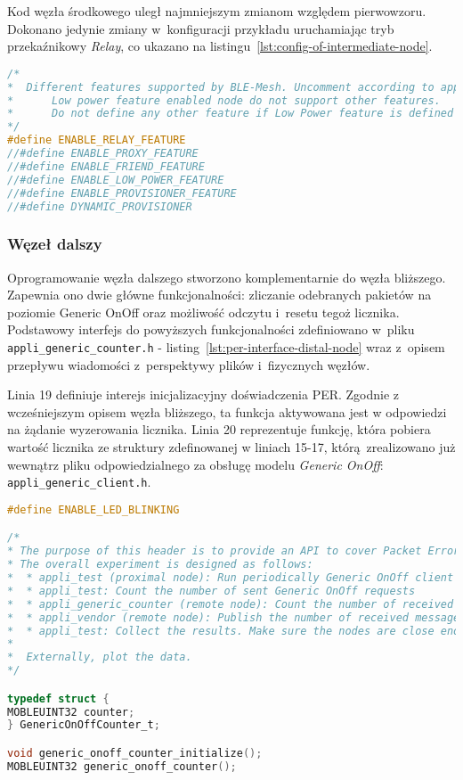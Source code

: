 Kod węzła środkowego uległ najmniejszym zmianom względem pierwowzoru. Dokonano jedynie zmiany w~konfiguracji przykładu
uruchamiając tryb przekaźnikowy \textit{Relay}, co ukazano na listingu~\ref{lst:config-of-intermediate-node}.

\begin{lstlisting}[language=C,
    caption={Konfiguracja węzła środkowego},
    label={lst:config-of-intermediate-node}]
/*
*  Different features supported by BLE-Mesh. Uncomment according to application.
*      Low power feature enabled node do not support other features. 
*      Do not define any other feature if Low Power feature is defined
*/
#define ENABLE_RELAY_FEATURE
//#define ENABLE_PROXY_FEATURE
//#define ENABLE_FRIEND_FEATURE
//#define ENABLE_LOW_POWER_FEATURE
//#define ENABLE_PROVISIONER_FEATURE
//#define DYNAMIC_PROVISIONER
\end{lstlisting}

\subsubsection{Węzeł dalszy}

Oprogramowanie węzła dalszego stworzono komplementarnie do węzła bliższego. Zapewnia ono dwie główne funkcjonalności:
zliczanie odebranych pakietów na poziomie Generic OnOff oraz możliwość odczytu i~resetu tegoż licznika. Podstawowy interfejs do 
powyższych funkcjonalności zdefiniowano w~pliku \texttt{appli\_generic\_counter.h} - listing~\ref{lst:per-interface-distal-node}
wraz z~opisem przepływu wiadomości z~perspektywy plików i~fizycznych węzłów.

Linia 19 definiuje interejs inicjalizacyjny doświadczenia PER. Zgodnie z wcześniejszym opisem węzła bliższego,
ta funkcja aktywowana jest w odpowiedzi na żądanie wyzerowania licznika. Linia 20 reprezentuje funkcję,
która pobiera wartość licznika ze struktury zdefinowanej w liniach 15-17, którą zrealizowano już wewnątrz
pliku odpowiedzialnego za obsługę modelu \textit{Generic OnOff}: \texttt{appli\_generic\_client.h}.

\begin{lstlisting}[language=C,
    caption={Interfejs eksperymentu PER dla węzła dalszego},
    label={lst:per-interface-distal-node}]
#define ENABLE_LED_BLINKING

/*
* The purpose of this header is to provide an API to cover Packet Error Rate experiment.
* The overall experiment is designed as follows:
*  * appli_test (proximal node): Run periodically Generic OnOff client model (SET-05)
*  * appli_test: Count the number of sent Generic OnOff requests
*  * appli_generic_counter (remote node): Count the number of received messages
*  * appli_vendor (remote node): Publish the number of received messages
*  * appli_test: Collect the results. Make sure the nodes are close enough to get the results
*
*  Externally, plot the data.
*/

typedef struct {
MOBLEUINT32 counter;
} GenericOnOffCounter_t;

void generic_onoff_counter_initialize();
MOBLEUINT32 generic_onoff_counter();
\end{lstlisting}

